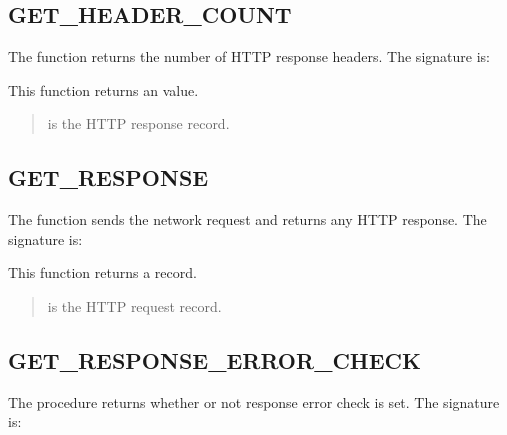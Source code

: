 \documentclass[letterpaper,10pt,english,openany,oneside]{sphinxmanual}
\begin{document}
\subsection{GET\_HEADER\_COUNT}
\label{\detokenize{utl_http:get-header-count}}
The  function returns the number of HTTP response
headers. The signature is:
\begin{quote}

\end{quote}

This function returns an  value.


\begin{quote}

 is the HTTP response record.
\end{quote}


\subsection{GET\_RESPONSE}
\label{\detokenize{utl_http:get-response}}
The  function sends the network request and returns any
HTTP response. The signature is:
\begin{quote}

\end{quote}

This function returns a  record.


\begin{quote}

 is the HTTP request record.
\end{quote}


\subsection{GET\_RESPONSE\_ERROR\_CHECK}
\label{\detokenize{utl_http:get-response-error-check}}
The  procedure returns whether or not
response error check is set. The signature is:
\begin{quote}

\end{quote}
\end{document}
